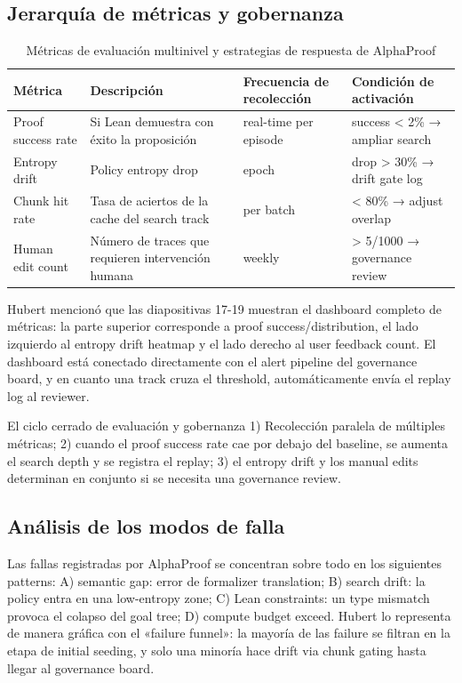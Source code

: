 \documentclass[a4paper]{article}
\begin{document}
\subsection{Jerarquía de métricas y gobernanza}
\begin{table}[H]
\centering
\begin{tabular}{p{3.5cm}p{4cm}p{3.5cm}p{3cm}}
\toprule
Métrica & Descripción & Frecuencia de recolección & Condición de activación \\
\midrule
Proof success rate & Si Lean demuestra con éxito la proposición & real-time per episode & success < 2\% → ampliar search \\
Entropy drift & Policy entropy drop & epoch & drop > 30\% → drift gate log \\
Chunk hit rate & Tasa de aciertos de la cache del search track & per batch & < 80\% → adjust overlap \\
Human edit count & Número de traces que requieren intervención humana & weekly & > 5/1000 → governance review \\
\bottomrule
\end{tabular}
\caption{Métricas de evaluación multinivel y estrategias de respuesta de AlphaProof}
\end{table}

Hubert mencionó que las diapositivas 17-19 muestran el dashboard completo de métricas: la parte superior corresponde a proof success/distribution, el lado izquierdo al entropy drift heatmap y el lado derecho al user feedback count. El dashboard está conectado directamente con el alert pipeline del governance board, y en cuanto una track cruza el threshold, automáticamente envía el replay log al reviewer.

\begin{importantbox}{El ciclo cerrado de evaluación y gobernanza}
1) Recolección paralela de múltiples métricas; 2) cuando el proof success rate cae por debajo del baseline, se aumenta el search depth y se registra el replay; 3) el entropy drift y los manual edits determinan en conjunto si se necesita una governance review.
\end{importantbox}

\subsection{Análisis de los modos de falla}
Las fallas registradas por AlphaProof se concentran sobre todo en los siguientes patterns: A) semantic gap: error de formalizer translation; B) search drift: la policy entra en una low-entropy zone; C) Lean constraints: un type mismatch provoca el colapso del goal tree; D) compute budget exceed. Hubert lo representa de manera gráfica con el «failure funnel»: la mayoría de las failure se filtran en la etapa de initial seeding, y solo una minoría hace drift via chunk gating hasta llegar al governance board.
\end{document}
